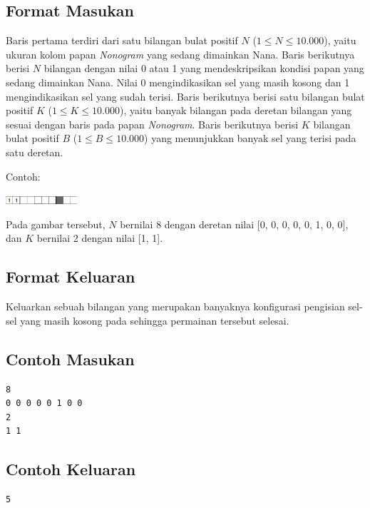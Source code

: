\documentclass{article}
\begin{document}
\subsection*{Format Masukan}

Baris pertama terdiri dari satu bilangan bulat positif $N$ ($1 \leq N \leq 10.000$), yaitu ukuran kolom papan \textit{Nonogram} yang sedang dimainkan Nana.
Baris berikutnya berisi $N$ bilangan dengan nilai 0 atau 1 yang mendeskripsikan kondisi papan  yang sedang dimainkan Nana. 
Nilai 0 mengindikasikan sel yang masih kosong dan 1 mengindikasikan sel yang sudah terisi.
Baris berikutnya berisi satu bilangan bulat positif $K$ ($1 \leq K \leq 10.000$), yaitu banyak bilangan pada deretan bilangan yang sesuai dengan baris pada papan \textit{Nonogram}.
Baris berikutnya berisi $K$ bilangan bulat positif $B$ ($1 \leq B \leq 10.000$) yang menunjukkan banyak sel yang terisi pada satu deretan.

Contoh:

\includegraphics[width=100px]{Nonogram-Row}

Pada gambar tersebut, $N$ bernilai 8 dengan deretan nilai [0, 0, 0, 0, 0, 1, 0, 0], dan $K$ bernilai 2 dengan nilai [1, 1].

\subsection*{Format Keluaran}

Keluarkan sebuah bilangan yang merupakan banyaknya konfigurasi pengisian sel-sel yang masih kosong pada  
sehingga permainan tersebut selesai.
\\

\begin{multicols}{2}
\subsection*{Contoh Masukan}
\begin{lstlisting}
8
0 0 0 0 0 1 0 0
2
1 1
\end{lstlisting}
\columnbreak
\subsection*{Contoh Keluaran}
\begin{lstlisting}
5
\end{lstlisting}
\vfill
\null
\end{multicols}

\pagebreak
\end{document}
